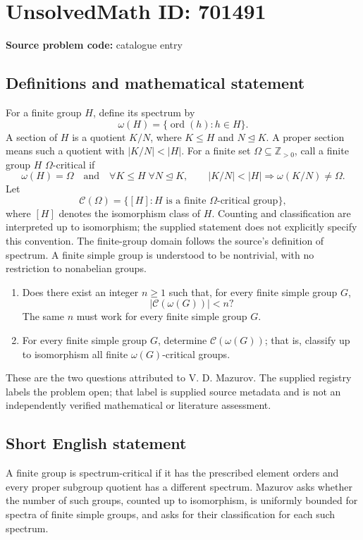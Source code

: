 \documentclass[11pt]{article}
\newcommand{\Z}{\mathbb{Z}}
\begin{document}
\section*{UnsolvedMath ID: 701491}
\textbf{Source problem code:} catalogue entry
\subsection{Definitions and mathematical statement}
For a finite group \(H\), define its spectrum by
\[
\omega(H)=\{\operatorname{ord}(h):h\in H\}.
\]
A section of \(H\) is a quotient \(K/N\), where \(K\leq H\) and \(N\trianglelefteq K\). A proper section means such a quotient with \(|K/N|<|H|\). For a finite set \(\Omega\subseteq\Z_{>0}\), call a finite group \(H\) \(\Omega\)-critical if
\[
\omega(H)=\Omega
\quad\text{and}\quad
\forall K\leq H\;\forall N\trianglelefteq K,
\qquad |K/N|<|H|\Longrightarrow\omega(K/N)\ne\Omega.
\]
Let
\[
\mathcal C(\Omega)=\{[H]:H\text{ is a finite }\Omega\text{-critical group}\},
\]
where \([H]\) denotes the isomorphism class of \(H\). Counting and classification are interpreted up to isomorphism; the supplied statement does not explicitly specify this convention. The finite-group domain follows the source's definition of spectrum. A finite simple group is understood to be nontrivial, with no restriction to nonabelian groups.

\begin{enumerate}
\item[(a)] Does there exist an integer \(n\geq1\) such that, for every finite simple group \(G\),
\[
|\mathcal C(\omega(G))|<n?
\]
The same \(n\) must work for every finite simple group \(G\).
\item[(b)] For every finite simple group \(G\), determine \(\mathcal C(\omega(G))\); that is, classify up to isomorphism all finite \(\omega(G)\)-critical groups.
\end{enumerate}
These are the two questions attributed to V. D. Mazurov. The supplied registry labels the problem open; that label is supplied source metadata and is not an independently verified mathematical or literature assessment.
\subsection{Short English statement}
A finite group is spectrum-critical if it has the prescribed element orders and every proper subgroup quotient has a different spectrum. Mazurov asks whether the number of such groups, counted up to isomorphism, is uniformly bounded for spectra of finite simple groups, and asks for their classification for each such spectrum.
\end{document}
